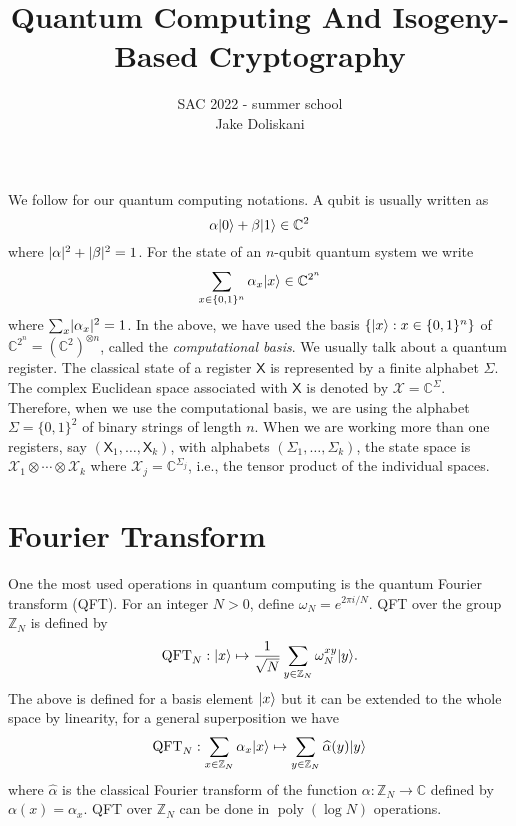 \documentclass[11pt]{article}
\title{Quantum Computing And Isogeny-Based Cryptography}
\author{
    SAC 2022 - summer school \\
	Jake Doliskani
}
\date{}
\theoremstyle{plain}
\theoremstyle{definition}
\DeclareMathOperator{\poly}{poly}
\DeclarePairedDelimiter{\abs}{\lvert}{\rvert}
\DeclarePairedDelimiter{\ket}{\lvert}{\rangle}
\def\C{\mathbb{C}}
\def\Z{\mathbb{Z}}
\def\X{\mathcal{X}}
\begin{document}
\maketitle




We follow \cite{watrous2018theory} for our quantum computing notations. A qubit is usually written as
\[ \alpha\ket{0} + \beta\ket{1} \in \C^2 \]
where $\abs{\alpha}^2 + \abs{\beta}^2 = 1$. For the state of an $n$-qubit quantum system we write
\[ \sum_{x \in \{0, 1\}^n} \alpha_x \ket{x} \in \C^{2^n} \]
where $\sum_x \abs{\alpha_x}^2 = 1$. In the above, we have used the basis $\{ \ket{x} : x \in \{0, 1\}^n \}$ of $\C^{2^n} = (\C^2)^{\otimes n}$, called the \textit{computational basis}. We usually talk about a quantum register. The classical state  of a register $\mathsf{X}$ is represented by a finite alphabet $\Sigma$. The complex Euclidean space associated with $\mathsf{X}$ is denoted by $\X = \C^\Sigma$. Therefore, when we use the computational basis, we are using the alphabet $\Sigma = \{0, 1\}^2$ of binary strings of length $n$. When we are working more than one registers, say $(\mathsf{X}_1, \dots, \mathsf{X}_k)$, with alphabets $(\Sigma_1, \dots, \Sigma_k)$, the state space is $\X_1 \otimes \cdots \otimes \X_k$ where $\X_j = \C^{\Sigma_j}$, i.e., the tensor product of the individual spaces.  



\section{Fourier Transform}

One the most used operations in quantum computing is the quantum Fourier transform (QFT). For an integer $N > 0$, define $\omega_N = e^{2\pi i / N}$. QFT over the group $\Z_N$ is defined by
\[ \mathrm{QFT}_N: \ket{x} \mapsto \frac{1}{\sqrt{N}} \sum_{y \in \Z_N} \omega_N^{xy} \ket{y}. \]
The above is defined for a basis element $\ket{x}$ but it can be extended to the whole space by linearity, for a general superposition we have
\[ \mathrm{QFT}_N: \sum_{x \in \Z_N} \alpha_x \ket{x} \mapsto \sum_{y \in \Z_N} \widehat{\alpha}(y) \ket{y} \]
where $\widehat{\alpha}$ is the classical Fourier transform of the function $\alpha: \Z_N \rightarrow \C$ defined by $\alpha(x) = \alpha_x$. QFT over $\Z_N$ can be done in $\poly(\log N)$ operations.
\end{document}
